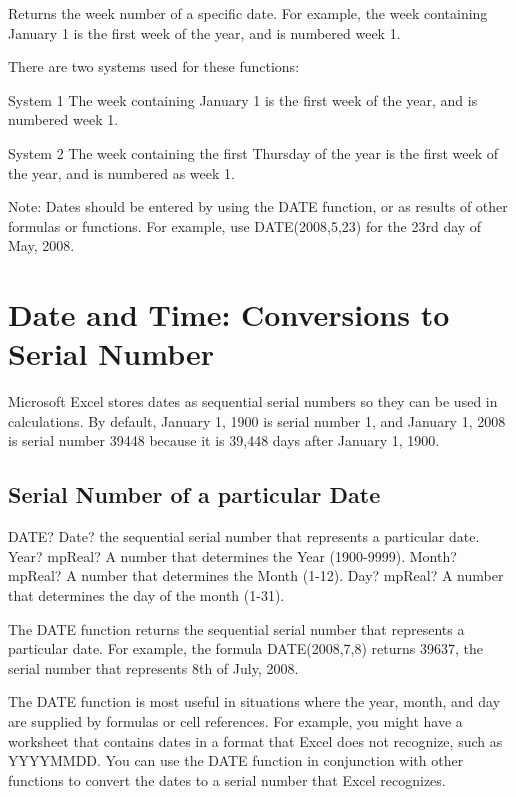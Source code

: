 Returns the week number of a specific date. For example, the week containing January 1 is the first week of the year, and is numbered week 1.

There are two systems used for these functions:

System 1  The week containing January 1 is the first week of the year, and is numbered week 1.

System 2  The week containing the first Thursday of the year is the first week of the year, and is numbered as week 1.

Note: Dates should be entered by using the DATE function, or as results of other formulas or functions. For example, use DATE(2008,5,23) for the 23rd day of May, 2008.




\newpage
\section{Date and Time: Conversions to Serial Number}
Microsoft Excel stores dates as sequential serial numbers so they can be used in calculations. By default, January 1, 1900 is serial number 1, and January 1, 2008 is serial number 39448 because it is 39,448 days after January 1, 1900.


\subsection{Serial Number of a particular Date}

\begin{mpFunctionsExtract}
	\mpWorksheetFunctionThreeNotImplemented
	{DATE? Date? the sequential serial number that represents a particular date.}
	{Year? mpReal? A number that determines the Year (1900-9999).}
	{Month? mpReal? A number that determines the Month (1-12).}
	{Day? mpReal? A number that determines the day of the month (1-31).}
\end{mpFunctionsExtract}

\vspace{0.3cm}
The DATE function returns the sequential serial number that represents a particular date. For example, the formula DATE(2008,7,8) returns 39637, the serial number that represents 8th of July, 2008.

The DATE function is most useful in situations where the year, month, and day are supplied by formulas or cell references. For example, you might have a worksheet that contains dates in a format that Excel does not recognize, such as YYYYMMDD. You can use the DATE function in conjunction with other functions to convert the dates to a serial number that Excel recognizes.





